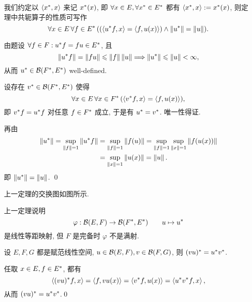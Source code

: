 	我们约定以 $ \left\langle x^{*}, x \right\rangle $ 来记 $ x^{*}(x) $, 即 $ \forall x\in E, \forall x^{*}\in E^{*} $ 都有 $ \left\langle x^{*}, x \right\rangle:=x^{*}(x) $, 则定理中共轭算子的性质可写作
	\[
		\forall x\in E\,\forall f\in E^{*}\,((\left\langle u^{*}f, x \right\rangle=\left\langle f, u(x) \right\rangle)\land\left\| u^{*} \right\|=\left\| u \right\|).
	\]
	\begin{Proof}
		由题设 $ \forall f\in F: u^{*}f=fu\in E^{*} $, 且
		\[
			\left\| u^{*}f \right\|=\left\| fu \right\|\leqslant\left\| f \right\|\left\| u \right\|\Longrightarrow\left\| u^{*} \right\|\leqslant\left\| u \right\|<\infty,
		\]
		从而 $ u^{*}\in\mathcal{B}(F^{*}, E^{*}) $ well-defined.

		设存在 $ v^{*}\in\mathcal{B}(F^{*}, E^{*}) $ 使得
		\[
			\forall x\in E\,\forall x\in F^{*}\,(\left\langle v^{*}f, x \right\rangle=\left\langle f, u(x) \right\rangle),
		\]
		即 $ v^{*}f=u^{*}f $ 对任意 $ f\in F^{*} $ 成立, 于是有 $ u^{*}=v^{*} $. 唯一性得证.

		再由
		\[
			\begin{aligned}
				\left\| u^{*} \right\|=\sup_{\left\| f \right\|=1}\left\| u^{*}f \right\| & = \sup_{\left\| f \right\|=1}\left\| f(u) \right\|=\sup_{\left\| f \right\|=1}\sup_{\left\| x \right\|=1}\left\| f(u(x)) \right\|\\
				& = \sup_{\left\| x \right\|=1}\left\| u(x) \right\|=\left\| u \right\|.
			\end{aligned}
		\]
		即 $ \left\| u^{*} \right\|=\left\| u \right\| $. \qed
	\end{Proof}
	
	上一定理的交换图如图所示.
		\begin{center}
		\end{center}
	\begin{Remark}
		上一定理说明
		\[
			\varphi:\mathcal{B}(E, F)\to \mathcal{B}(F^{*}, E^{*})\qquad u\mapsto u^{*}
		\]
		是线性等距映射, 但 $ F $ 是完备时 $ \varphi $ 不是满射.
	\end{Remark}

	\begin{Proposition}
		设 $ E, F, G $ 都是赋范线性空间, $ u\in\mathcal{B}(E, F), v\in\mathcal{B}(F, G) $, 则 $ (vu)^{*}=u^{*}v^{*} $.
	\end{Proposition}
	\begin{Proof}
		任取 $ x\in E, f\in E^{*} $, 都有
		\[
			\left\langle (vu)^{*}f, x \right\rangle=\left\langle f, vu(x) \right\rangle=\left\langle v^{*}f, u(x) \right\rangle=\left\langle u^{*}v^{*}f, x \right\rangle,
		\]
		从而 $ (vu)^{*}=u^{*}v^{*} $.\qed
	\end{Proof}

